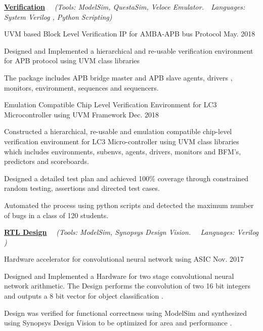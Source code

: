 \begin{flushleft}
  \par\addvspace{-1.5mm}
  \fontsize{10.4pt}{1em}\selectfont\underline{\textbf{\color{black}Verification}} \ \ \textit{(\color{text}Tools: ModelSim, QuestaSim, Veloce Emulator.\ \ Languages: System Verilog , Python Scripting)}
\end{flushleft}
\par\addvspace{-0.5ex}
\begin{cvprojects}
  \cvproject
    {UVM based Block Level Verification IP for AMBA-APB bus Protocol} 
    {\color{darkgray}May. 2018}
    {
      \begin{cvprojectitems}
        \item {Designed and Implemented a hierarchical and re-usable verification environment for APB protocol using UVM class libraries}
        \item {The package includes APB bridge master and APB slave agents, drivers , monitors, environment, sequences and sequencers. }
      \end{cvprojectitems}
    }
  \cvproject
    {Emulation Compatible Chip Level Verification Environment for LC3 Microcontroller using UVM Framework }
    {\color{darkgray}Dec. 2018}
    {
      \begin{cvprojectitems}
        \item {Constructed a hierarchical, re-usable and emulation compatible chip-level verification environment for LC3 Micro-controller using UVM class libraries which includes environments, subenvs, agents, drivers, monitors and BFM's, predictors and scoreboards.}
        \item {Designed a detailed test plan and achieved 100\% coverage through constrained random testing, assertions and directed test cases.}
        \item {Automated the process using python scripts and detected the maximum number of bugs in a class of 120 students.}
      \end{cvprojectitems}
    }
    \par\addvspace{3ex}
    \begin{flushleft}
    \par\addvspace{-1.5mm}
    \fontsize{10.4pt}{1em}\selectfont\underline{\textbf{\color{black}RTL Design}} \ \ \textit{(\color{text}Tools: ModelSim, Synopsys Design Vision. \ \ Languages: Verilog )}
    \end{flushleft}
    \par\addvspace{0.3ex}
    \cvproject
    {Hardware accelerator for convolutional neural network using ASIC }
    {\color{darkgray}Nov. 2017}
    {
      \begin{cvprojectitems}
        \item {Designed and Implemented a Hardware for two stage convolutional neural network arithmetic. The Design performs the convolution of two 16 bit integers and outputs a 8 bit vector for object classification . }
        \item {Design was verified for functional correctness using ModelSim and synthesized using Synopsys Design Vision to be optimized for area and performance .} 
      \end{cvprojectitems}
    }


\end{cvprojects}
